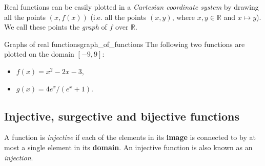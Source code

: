 Real functions can be easily plotted in a \emph{Cartesian coordinate system} by drawing all the points $\left( x,f(x) \right)$ (i.e. all the points $\left( x,y \right)$, where $x,y\in\mathbb{R}$ and $x\mapsto y$). We call these points the \emph{graph} of $f$ over $\mathbb{R}$.

\begin{example}{Graphs of real functions}{graph_of_functions}
	The following two functions are plotted on the domain $\left[ -9,9 \right]$:

	\begin{minipage}{0.3\textwidth}
		\begin{itemize}
			\item \textcolor{xred}{$f(x)=x^{2}-2x-3$},
			\item \textcolor{xgreen}{$g(x)=4e^{x}/\left( e^{x}+1 \right)$}.
		\end{itemize}
	\end{minipage}%
	\begin{minipage}[c]{0.7\textwidth}
		\centering
	\end{minipage}
\end{example}

\subsection{Injective, surgective and bijective functions}
A function is \emph{injective} if each of the elements in its \textbf{image} is connected to by at most a single element in its \textbf{domain}. An injective function is also known as an \emph{injection}.

